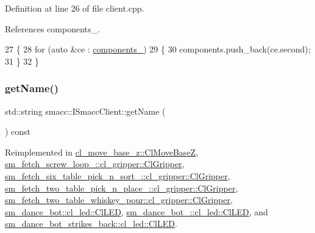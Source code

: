 Definition at line 26 of file client.\+cpp.



References components\+\_\+.


\begin{DoxyCode}
27 \{
28     \textcolor{keywordflow}{for} (\textcolor{keyword}{auto} &ce : \hyperlink{classsmacc_1_1ISmaccClient_a9e670e9071bb549dbeb08985d0114afe}{components\_})
29     \{
30         components.push\_back(ce.second);
31     \}
32 \}
\end{DoxyCode}
\mbox{\label{classsmacc_1_1ISmaccClient_a8c3ce19f182e71909c5dc6263d25be69}} 
\subsubsection{\texorpdfstring{get\+Name()}{getName()}}
{\footnotesize\ttfamily std\+::string smacc\+::\+I\+Smacc\+Client\+::get\+Name (\begin{DoxyParamCaption}{ }\end{DoxyParamCaption}) const\hspace{0.3cm}{\ttfamily [virtual]}}



Reimplemented in \hyperlink{classcl__move__base__z_1_1ClMoveBaseZ_a3c511340ea5df8cbdb833c6c701c47f8}{cl\+\_\+move\+\_\+base\+\_\+z\+::\+Cl\+Move\+BaseZ}, \hyperlink{classsm__fetch__screw__loop__1_1_1cl__gripper_1_1ClGripper_a4ccd942c59f65959af1d2c54253fd3f2}{sm\+\_\+fetch\+\_\+screw\+\_\+loop\+\_\+::cl\+\_\+gripper\+::\+Cl\+Gripper}, \hyperlink{classsm__fetch__six__table__pick__n__sort__1_1_1cl__gripper_1_1ClGripper_a6da358b84df6a45b7ee6d71b8ef1fa50}{sm\+\_\+fetch\+\_\+six\+\_\+table\+\_\+pick\+\_\+n\+\_\+sort\+\_\+::cl\+\_\+gripper\+::\+Cl\+Gripper}, \hyperlink{classsm__fetch__two__table__pick__n__place__1_1_1cl__gripper_1_1ClGripper_a2f6873bc11155e36252434cbbe43939e}{sm\+\_\+fetch\+\_\+two\+\_\+table\+\_\+pick\+\_\+n\+\_\+place\+\_\+::cl\+\_\+gripper\+::\+Cl\+Gripper}, \hyperlink{classsm__fetch__two__table__whiskey__pour_1_1cl__gripper_1_1ClGripper_a9790f119467bb9021f50d6a467f49108}{sm\+\_\+fetch\+\_\+two\+\_\+table\+\_\+whiskey\+\_\+pour\+::cl\+\_\+gripper\+::\+Cl\+Gripper}, \hyperlink{classsm__dance__bot_1_1cl__led_1_1ClLED_aa0a9fb92df96fb1bbba35c78fbe4119d}{sm\+\_\+dance\+\_\+bot\+::cl\+\_\+led\+::\+Cl\+L\+ED}, \hyperlink{classsm__dance__bot__2_1_1cl__led_1_1ClLED_a8d0ff178a2228a1b1c32142987f860dc}{sm\+\_\+dance\+\_\+bot\+\_\+::cl\+\_\+led\+::\+Cl\+L\+ED}, and \hyperlink{classsm__dance__bot__strikes__back_1_1cl__led_1_1ClLED_aa774d43fe5a936b4bf292cb5447becd9}{sm\+\_\+dance\+\_\+bot\+\_\+strikes\+\_\+back\+::cl\+\_\+led\+::\+Cl\+L\+ED}.



